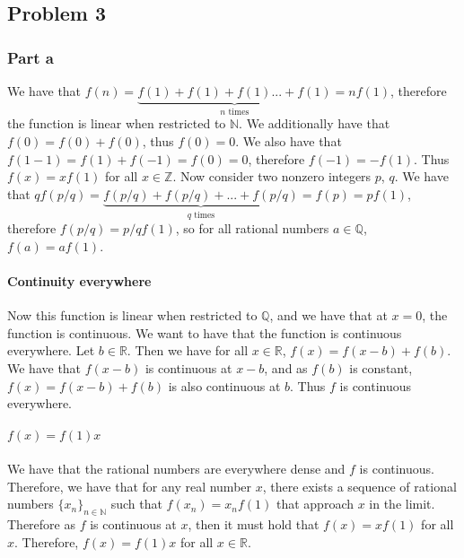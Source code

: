 \documentclass{article}
\theoremstyle{definition}
\numberwithin{theorem}{section}
\numberwithin{equation}{section}
\begin{document}
\subsection{Problem 3}
\subsubsection{Part a}
We have that $f(n) = \underbrace{f(1) + f(1) + f(1) ... + f(1)}_{n \text{ times}} = n f(1) $, therefore the function is linear when restricted to $\mathbb{N}$. We additionally have that $f(0) = f(0) + f(0)$, thus $f(0) = 0$. We also have that $f(1 - 1) = f(1) + f(-1) = f(0) = 0$, therefore $f(-1) = - f(1)$. Thus $f(x) = x f(1)$ for all $x \in \mathbb{Z}$. Now consider two nonzero integers $p$, $q$. We have that $q f(p/q) = \underbrace{f(p/q) + f(p/q) + ... + f(p/q)}_{q \text{ times}} = f(p) = p f(1)$, therefore $f(p/q) = p/q f(1)$, so for all rational numbers $a \in \mathbb{Q}$, $f(a) = a f(1)$. 
\paragraph{Continuity everywhere}
Now this function is linear when restricted to $\mathbb{Q}$, and we have that at $x = 0$, the function is continuous. We want to have that the function is continuous everywhere. Let $b \in \mathbb{R}$. Then we have for all $x \in \mathbb{R}$, $f(x) = f(x - b) + f(b)$. We have that $f(x - b)$ is continuous at $x - b$, and as $f(b)$ is constant, $f(x) = f(x - b) + f(b)$ is also continuous at $b$. Thus $f$ is continuous everywhere.
\paragraph{$f(x) = f(1) x$}
We have that the rational numbers are everywhere dense and $f$ is continuous. Therefore, we have that for any real number $x$, there exists a sequence of rational numbers $\lbrace x_n \rbrace_{n \in \mathbb{N}}$ such that $f(x_n) = x_n f(1)$ that approach $x$ in the limit. Therefore as $f$ is continuous at $x$, then it must hold that $f(x) = x f(1)$ for all $x$. Therefore, $f(x) = f(1) x$ for all $x \in \mathbb{R}$. 
\end{document}
